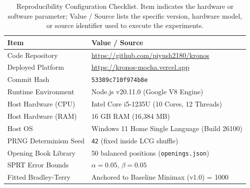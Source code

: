\begin{table}[htbp]
\centering
\caption[Reproducibility Configuration Checklist]{Reproducibility Configuration Checklist. Item indicates the hardware or software parameter; Value / Source lists the specific version, hardware model, or source identifier used to execute the experiments.}
\label{tab:reproducibility_checklist}

\begin{tabularx}{\textwidth}{lX}
\toprule
\textbf{Item} & \textbf{Value / Source} \\
\midrule
Code Repository & \url{https://github.com/piyush2180/kronos} \\
Deployed Platform & \url{https://kronos-mocha.vercel.app} \\
Commit Hash & \texttt{53389c710f974b8e} \\
Runtime Environment & Node.js v20.11.0 (Google V8 Engine) \\
Host Hardware (CPU) & Intel Core i5-1235U (10 Cores, 12 Threads) \\
Host Hardware (RAM) & 16 GB RAM (16,384 MB) \\
Host OS            & Windows 11 Home Single Language (Build 26100) \\
PRNG Determinism Seed & \texttt{42} (fixed inside LCG shuffle) \\
Opening Book Library & 50 balanced positions (\texttt{openings.json}) \\
SPRT Error Bounds & $\alpha = 0.05$, $\beta = 0.05$ \\
Fitted Bradley-Terry & Anchored to Baseline Minimax (v1.0) = 1000 \\
\bottomrule
\end{tabularx}
\end{table}


